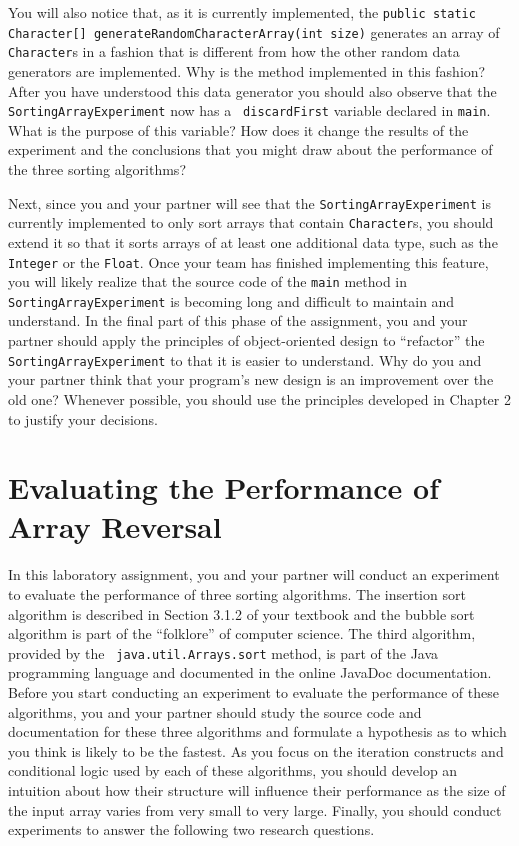 You will also notice that, as it is currently implemented, the {\tt public static Character[]
generateRandomCharacterArray(int size)} generates an array of {\tt Character}s in a fashion that is different from how
the other random data generators are implemented. Why is the method implemented in this fashion? After you have
understood this data generator you should also observe that the {\tt SortingArrayExperiment} now has a {\tt
discardFirst} variable declared in {\tt main}. What is the purpose of this variable? How does it change the results of
the experiment and the conclusions that you might draw about the performance of the three sorting algorithms?

Next, since you and your partner will see that the {\tt SortingArrayExperiment} is currently implemented to only sort
arrays that contain {\tt Character}s, you should extend it so that it sorts arrays of at least one additional data type,
such as the {\tt Integer} or the {\tt Float}. Once your team has finished implementing this feature, you will likely
realize that the source code of the {\tt main} method in {\tt SortingArrayExperiment} is becoming long and difficult to
maintain and understand. In the final part of this phase of the assignment, you and your partner should apply the
principles of object-oriented design to ``refactor'' the {\tt SortingArrayExperiment} to that it is easier to
understand. Why do you and your partner think that your program's new design is an improvement over the old one?
Whenever possible, you should use the principles developed in Chapter 2 to justify your decisions.

\section*{Evaluating the Performance of Array Reversal}

In this laboratory assignment, you and your partner will conduct an experiment to evaluate the performance of three
sorting algorithms. The insertion sort algorithm is described in Section 3.1.2 of your textbook and the bubble sort
algorithm is part of the ``folklore'' of computer science. The third algorithm, provided by the {\tt
java.util.Arrays.sort} method, is part of the Java programming language and documented in the online JavaDoc
documentation. Before you start conducting an experiment to evaluate the performance of these algorithms, you and your
partner should study the source code and documentation for these three algorithms and formulate a hypothesis as to which
you think is likely to be the fastest. As you focus on the iteration constructs and conditional logic used by each of
these algorithms, you should develop an intuition about how their structure will influence their performance as the size
of the input array varies from very small to very large. Finally, you should conduct experiments to answer the following
two research questions.

